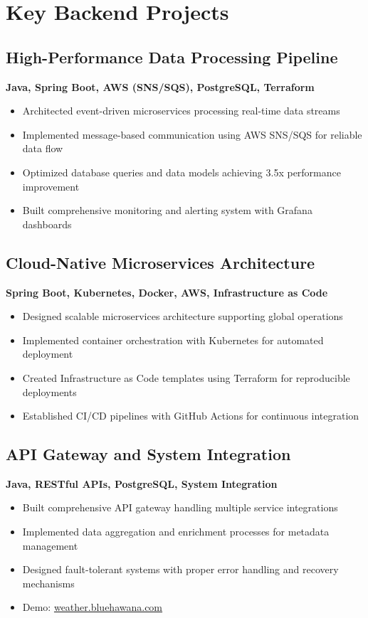 \documentclass[11pt,a4paper]{article}
\begin{document}
\section*{Key Backend Projects}

\subsection{High-Performance Data Processing Pipeline}
\textbf{Java, Spring Boot, AWS (SNS/SQS), PostgreSQL, Terraform}
\begin{itemize}[noitemsep]
  \item Architected event-driven microservices processing real-time data streams
  \item Implemented message-based communication using AWS SNS/SQS for reliable data flow
  \item Optimized database queries and data models achieving 3.5x performance improvement
  \item Built comprehensive monitoring and alerting system with Grafana dashboards
\end{itemize}

\subsection{Cloud-Native Microservices Architecture}
\textbf{Spring Boot, Kubernetes, Docker, AWS, Infrastructure as Code}
\begin{itemize}[noitemsep]
  \item Designed scalable microservices architecture supporting global operations
  \item Implemented container orchestration with Kubernetes for automated deployment
  \item Created Infrastructure as Code templates using Terraform for reproducible deployments
  \item Established CI/CD pipelines with GitHub Actions for continuous integration
\end{itemize}

\subsection{API Gateway and System Integration}
\textbf{Java, RESTful APIs, PostgreSQL, System Integration}
\begin{itemize}[noitemsep]
  \item Built comprehensive API gateway handling multiple service integrations
  \item Implemented data aggregation and enrichment processes for metadata management
  \item Designed fault-tolerant systems with proper error handling and recovery mechanisms
  \item Demo: \href{https://weather.bluehawana.com}{weather.bluehawana.com}
\end{itemize}
\end{document}
